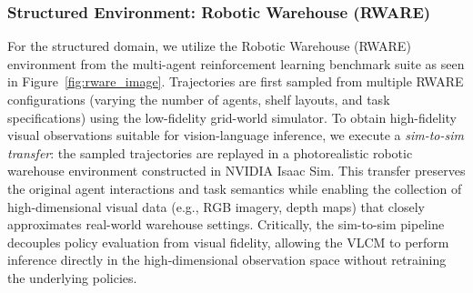 \documentclass[letterpaper, 10 pt, conference]{ieeeconf}  %
\begin{document}
\subsubsection{Structured Environment: Robotic Warehouse (RWARE)}\label{sec:rware}
For the structured domain, we utilize the Robotic Warehouse (RWARE)~\cite{papoudakis2021benchmarking} environment from the multi-agent reinforcement learning benchmark suite as seen in Figure~\ref{fig:rware_image}. Trajectories are first sampled from multiple RWARE configurations (varying the number of agents, shelf layouts, and task specifications) using the low-fidelity grid-world simulator. To obtain high-fidelity visual observations suitable for vision-language inference, we execute a \textit{sim-to-sim transfer}: the sampled trajectories are replayed in a photorealistic robotic warehouse environment constructed in NVIDIA Isaac Sim. This transfer preserves the original agent interactions and task semantics while enabling the collection of high-dimensional visual data (e.g., RGB imagery, depth maps) that closely approximates real-world warehouse settings. Critically, the sim-to-sim pipeline decouples policy evaluation from visual fidelity, allowing the VLCM to perform inference directly in the high-dimensional observation space without retraining the underlying policies. 
\end{document}
